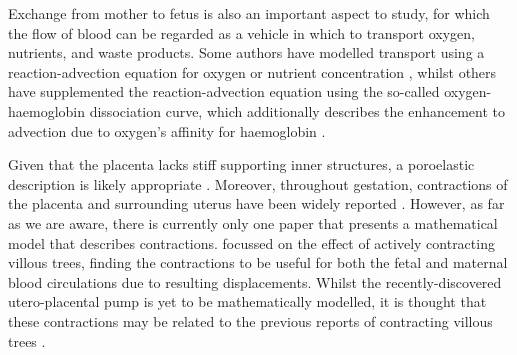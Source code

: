         Exchange from mother to fetus is also an important aspect to study, for which the flow of blood can be regarded as a vehicle in which to transport oxygen, nutrients, and waste products. Some authors have modelled transport using a reaction-advection equation for oxygen or nutrient concentration \cite{perazzoloModellingEffectIntervillous2017,perazzoloModellingNutrientTransfer2016,chernyavskyMathematicalModelIntervillous2010,erlichPhysicalGeometricDeterminants2019}, whilst others have supplemented the reaction-advection equation using the so-called oxygen-haemoglobin dissociation curve, which additionally describes the enhancement to advection due to oxygen's affinity for haemoglobin \cite{pearceImageBasedModelingBlood2016,serovOptimalVilliDensity2015,meklerImpactTissuePorosity2022}.

        Given that the placenta lacks stiff supporting inner structures, a poroelastic description is likely appropriate \cite{jensenBloodFlowTransport2019}. Moreover, throughout gestation, contractions of the placenta and surrounding uterus have been widely reported \cite{dellschaftHaemodynamicsHumanPlacenta2020,togashiSustainedUterineContractions1993,farleyContractilePropertiesHuman2004}. However, as far as we are aware, there is currently only one paper that presents a mathematical model that describes contractions. \citeauthor{katoVillousTreeModel2017} \cite{katoVillousTreeModel2017} focussed on the effect of actively contracting villous trees, finding the contractions to be useful for both the fetal and maternal blood circulations due to resulting displacements. Whilst the recently-discovered utero-placental pump is yet to be mathematically modelled, it is thought that these contractions may be related to the previous reports of contracting villous trees \cite{dellschaftHaemodynamicsHumanPlacenta2020}.

